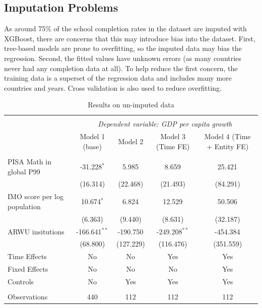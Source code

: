 \documentclass[11pt]{article}
\begin{document}
\subsection{Imputation Problems}
As around 75\% of the school completion rates in the dataset are imputed with XGBoost, there are concerns that this may introduce bias into the dataset. First, tree-based models are prone to overfitting, so the imputed data may bias the regression. Second, the fitted values have unknown errors (as many countries never had any completion data at all). To help reduce the first concern, the training data is a superset of the regression data and includes many more countries and years. Cross validation is also used to reduce overfitting.

\begin{table}[H] \centering
    \caption{Results on un-imputed data}
    \label{table:reg-noimpute}
    \resizebox{\linewidth}{!} {
    \begin{tabular}{@{\extracolsep{5pt}}lcccc}
    \\[-1.8ex]\hline
    \hline \\[-1.8ex]
    & \multicolumn{4}{c}{\textit{Dependent variable: GDP per capita growth}} \
    \cr \cline{2-5}
    \\[-1.8ex] & \multicolumn{1}{c}{Model 1 (base)} & \multicolumn{1}{c}{Model 2} & \multicolumn{1}{c}{Model 3 (Time FE)} & \multicolumn{1}{c}{Model 4 (Time + Entity FE)}  \\
    \hline \\[-1.8ex]
     PISA Math in global P99 & -31.228$^{*}$ & 5.985$^{}$ & 8.659$^{}$ & 25.421$^{}$ \\
    & (16.314) & (22.468) & (21.493) & (84.291) \\
     IMO score per log population & 10.674$^{*}$ & 6.824$^{}$ & 12.529$^{}$ & 50.506$^{}$ \\
    & (6.363) & (9.440) & (8.631) & (32.187) \\
     ARWU insitutions & -166.641$^{**}$ & -190.750$^{}$ & -249.208$^{**}$ & -454.384$^{}$ \\
    & (68.800) & (127.229) & (116.476) & (351.559) \\
     Time Effects & No & No & Yes & Yes \\
     Fixed Effects & No & No & No & Yes \\
     Controls & No & Yes & Yes & Yes \\
    \hline \\[-1.8ex]
     Observations & 440 & 112 & 112 & 112 \\

\end{tabular}}
\end{table}
\end{document}
